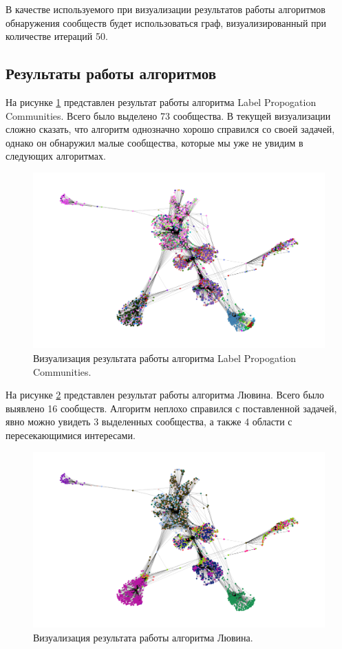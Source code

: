 В качестве используемого при визуализации результатов работы алгоритмов обнаружения сообществ будет использоваться граф, визуализированный при количестве итераций 50.

\subsection{Результаты работы алгоритмов}

На рисунке \ref{img:5} представлен результат работы алгоритма Label Propogation Communities. Всего было выделено 73 сообщества. В текущей визуализации сложно сказать, что алгоритм однозначно хорошо справился со своей задачей, однако он обнаружил малые сообщества, которые мы уже не увидим в следующих алгоритмах.

\begin{figure}[H]
	\centering
	\includegraphics[width=\textwidth]{inc/5.png}
	\caption{ Визуализация результата работы алгоритма Label Propogation Communities.}
	\label{img:5}
\end{figure}

На рисунке \ref{img:6} представлен результат работы алгоритма Лювина. Всего было выявлено 16 сообществ. Алгоритм неплохо справился с поставленной задачей, явно можно увидеть 3 выделенных сообщества, а также 4 области с пересекающимися интересами.

\begin{figure}[H]
	\centering
	\includegraphics[width=\textwidth]{inc/6.png}
	\caption{ Визуализация результата работы алгоритма Лювина.}
	\label{img:6}
\end{figure}

